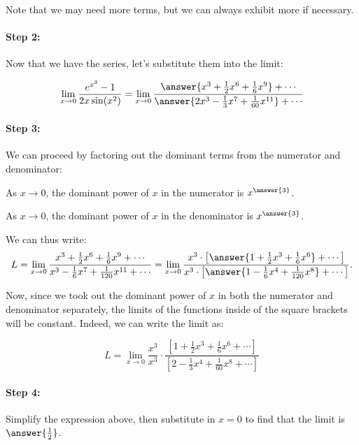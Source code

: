 \documentclass{ximera}
\begin{document}
\begin{exercise}
\begin{exercise}
Note that we may need more terms, but we can always exhibit more if necessary.  

\paragraph{Step 2:} Now that we have the series, let's substitute them into the limit:

\[
\lim_{x \to 0} \frac{e^{x^3}-1}{2x \sin(x^2)} = \lim_{x \to 0} \frac{  \answer{x^3+\frac{1}{2}x^6+\frac{1}{6}x^9} +\cdots}{\answer{2x^3-\frac{1}{3}x^7+\frac{1}{60}x^{11}} +\cdots}
\]

\paragraph{Step 3:} We can proceed by factoring out the dominant terms from the numerator and denominator:

As $x \to 0$, the dominant power of $x$ in the numerator is $x^{\answer{3}}$.

As $x \to 0$, the dominant power of $x$ in the denominator is $x^{\answer{3}}$.

\begin{exercise}
We can thus write:
\[
L = \lim_{x \to 0} \frac{ x^3+\frac{1}{2}x^6+\frac{1}{6}x^9 +\cdots}{x^3-\frac{1}{6}x^7+\frac{1}{120}x^{11} +\cdots}  = \lim_{x \to 0} \frac{ x^3 \cdot \left[\answer{1+\frac{1}{2}x^3+\frac{1}{6}x^6} +\cdots\right]}{x^3 \cdot \left[\answer{1-\frac{1}{6}x^4+\frac{1}{120}x^{8}} +\cdots\right]}.
\]

\begin{exercise}
 Now, since we took out the dominant power of $x$ in both the numerator and denominator separately, the limits of the functions inside of the square brackets will be constant.  Indeed, we can write the limit as:

\[
L = \lim_{x \to 0} \frac{x^3}{x^3} \cdot \frac{\left[1+\frac{1}{2}x^3+\frac{1}{6}x^6+\cdots \right]}{\left[2-\frac{1}{3}x^4+\frac{1}{60}x^8 +\cdots \right]}
\]

\paragraph{Step 4:} Simplify the expression above, then substitute in $x=0$ to find that the limit is $\answer{\frac{1}{2}}$.


\end{exercise}
\end{exercise}
\end{exercise}
\end{exercise}
\end{document}
